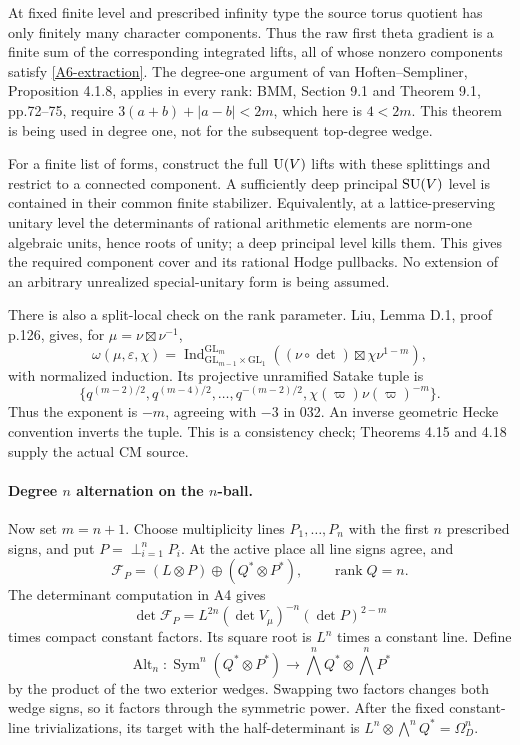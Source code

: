 \documentclass[11pt]{article}
\theoremstyle{definition}\newtheorem{definition}[theorem]{Definition}\newtheorem{remark}[theorem]{Remark}
\begin{document}
At fixed finite level and prescribed infinity type the source
torus quotient has only finitely many character components.
Thus the raw first theta gradient is a finite sum of the corresponding
integrated lifts, all of whose nonzero components satisfy
\eqref{A6-extraction}. The degree-one argument of
van Hoften--Sempliner, Proposition 4.1.8, applies in every rank:
BMM, Section 9.1 and Theorem 9.1, pp.72--75, require
$3(a+b)+|a-b|<2m$, which here is $4<2m$. This theorem is being
used in degree one, not for the subsequent top-degree wedge.

For a finite list of forms, construct the full $\operatorname{U}(V)$ lifts with
these splittings and restrict to a connected component. A sufficiently
deep principal $\operatorname{SU}(V)$ level is contained in their common finite
stabilizer. Equivalently, at a lattice-preserving unitary level the
determinants of rational arithmetic elements are norm-one algebraic
units, hence roots of unity; a deep principal level kills them.
This gives the required component cover and its rational Hodge
pullbacks. No extension of an arbitrary unrealized special-unitary
form is being assumed.

There is also a split-local check on the rank parameter. Liu,
Lemma D.1, proof p.126, gives, for
$\mu=\nu\boxtimes\nu^{-1}$,
\[
 \omega(\mu,\varepsilon,\chi)
 =\operatorname{Ind}_{\mathrm{GL}_{m-1}\times\mathrm{GL}_1}
                       ^{\mathrm{GL}_m}
       ((\nu\circ\det)\boxtimes\chi\nu^{1-m}),
\]
with normalized induction. Its projective unramified Satake tuple is
\[
 \{q^{(m-2)/2},q^{(m-4)/2},\ldots,q^{-(m-2)/2},
                   \chi(\varpi)\nu(\varpi)^{-m}\}.
\]
Thus the exponent is $-m$, agreeing with $-3$ in 032. An inverse
geometric Hecke convention inverts the tuple. This is a consistency
check; Theorems 4.15 and 4.18 supply the actual CM source.

\paragraph{Degree $n$ alternation on the $n$-ball.}
Now set $m=n+1$. Choose multiplicity lines $P_1,\ldots,P_n$ with
the first $n$ prescribed signs, and put $P=\perp_{i=1}^nP_i$.
At the active place all line signs agree, and
\[
 \mathcal F_P=(L\otimes P)\oplus(Q^*\otimes P^*),
 \qquad \operatorname{rank}Q=n.
\]
The determinant computation in A4 gives
\[
 \det\mathcal F_P=L^{2n}(\det V_\mu)^{-n}(\det P)^{2-m}
\]
times compact constant factors. Its square root is $L^n$ times a
constant line. Define
\[
 \operatorname{Alt}_n:\operatorname{Sym}^n(Q^*\otimes P^*)
       \longrightarrow\bigwedge^nQ^*\otimes\bigwedge^nP^*
\]
by the product of the two exterior wedges. Swapping two factors
changes both wedge signs, so it factors through the symmetric power.
After the fixed constant-line trivializations, its target with the
half-determinant is
$L^n\otimes\bigwedge^nQ^*=\Omega_D^n$.
\end{document}
